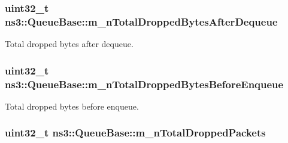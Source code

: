 \subsubsection[{\texorpdfstring{m\+\_\+n\+Total\+Dropped\+Bytes\+After\+Dequeue}{m_nTotalDroppedBytesAfterDequeue}}]{\setlength{\rightskip}{0pt plus 5cm}uint32\+\_\+t ns3\+::\+Queue\+Base\+::m\+\_\+n\+Total\+Dropped\+Bytes\+After\+Dequeue\hspace{0.3cm}{\ttfamily [private]}}\hypertarget{classns3_1_1QueueBase_acfe5d9451497268dad2e769552d1a9ed}{}\label{classns3_1_1QueueBase_acfe5d9451497268dad2e769552d1a9ed}


Total dropped bytes after dequeue. 

\subsubsection[{\texorpdfstring{m\+\_\+n\+Total\+Dropped\+Bytes\+Before\+Enqueue}{m_nTotalDroppedBytesBeforeEnqueue}}]{\setlength{\rightskip}{0pt plus 5cm}uint32\+\_\+t ns3\+::\+Queue\+Base\+::m\+\_\+n\+Total\+Dropped\+Bytes\+Before\+Enqueue\hspace{0.3cm}{\ttfamily [private]}}\hypertarget{classns3_1_1QueueBase_a0e961c057131d9b539598aeb2379136f}{}\label{classns3_1_1QueueBase_a0e961c057131d9b539598aeb2379136f}


Total dropped bytes before enqueue. 

\subsubsection[{\texorpdfstring{m\+\_\+n\+Total\+Dropped\+Packets}{m_nTotalDroppedPackets}}]{\setlength{\rightskip}{0pt plus 5cm}uint32\+\_\+t ns3\+::\+Queue\+Base\+::m\+\_\+n\+Total\+Dropped\+Packets\hspace{0.3cm}{\ttfamily [private]}}\hypertarget{classns3_1_1QueueBase_a92e199a6816438e21d8af97714842f9c}{}\label{classns3_1_1QueueBase_a92e199a6816438e21d8af97714842f9c}


